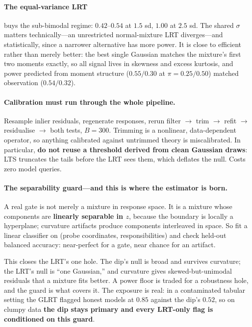 \documentclass[11pt]{article}
\begin{document}
\paragraph{The equal-variance LRT} buys the sub-bimodal regime: $0.42$--$0.54$ at $1.5$ sd,
$1.00$ at $2.5$ sd. The shared $\sigma$ matters technically---an unrestricted normal-mixture LRT
diverges---and statistically, since a narrower alternative has more power. It is close to
efficient rather than merely better: the best single Gaussian matches the mixture's first two
moments exactly, so all signal lives in skewness and excess kurtosis, and power predicted from
moment structure ($0.55 / 0.30$ at $\pi = 0.25 / 0.50$) matched observation ($0.54 / 0.32$).

\paragraph{Calibration must run through the whole pipeline.} Resample inlier residuals, regenerate
responses, rerun filter $\to$ trim $\to$ refit $\to$ residualise $\to$ both tests, $B = 300$.
Trimming is a nonlinear, data-dependent operator, so anything calibrated against untrimmed theory
is miscalibrated. In particular, \textbf{do not reuse a threshold derived from clean Gaussian
draws}: LTS truncates the tails before the LRT sees them, which deflates the null. Costs zero
model queries.

\paragraph{The separability guard---and this is where the estimator is born.} A real gate is not
merely a mixture in response space. It is a mixture whose components are \textbf{linearly
separable in $z$}, because the boundary is locally a hyperplane; curvature artifacts produce
components interleaved in space. So fit a linear classifier on (probe coordinates,
responsibilities) and check held-out balanced accuracy: near-perfect for a gate, near chance for
an artifact.

This closes the LRT's one hole. The dip's null is broad and survives curvature; the LRT's null is
``one Gaussian,'' and curvature gives skewed-but-unimodal residuals that a mixture fits better. A
power floor is traded for a robustness hole, and the guard is what covers it. The exposure is
real: in a contaminated tabular setting the GLRT flagged honest models at $0.85$ against the dip's
$0.52$, so on clumpy data \textbf{the dip stays primary and every LRT-only flag is conditioned on
this guard}.
\end{document}
